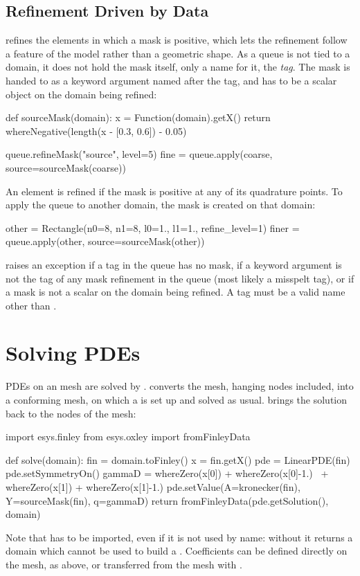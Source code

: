 \subsection{Refinement Driven by Data}\label{sec:oxley:mask}
 refines the elements in which a mask is positive, which
lets the refinement follow a feature of the model rather than a geometric
shape. As a queue is not tied to a domain, it does not hold the mask itself,
only a name for it, the \emph{tag}. The mask is handed to  as a
keyword argument named after the tag, and has to be a scalar \Data object on
the domain being refined:
\begin{python}
def sourceMask(domain):
    x = Function(domain).getX()
    return whereNegative(length(x - [0.3, 0.6]) - 0.05)

queue.refineMask("source", level=5)
fine = queue.apply(coarse, source=sourceMask(coarse))
\end{python}
An element is refined if the mask is positive at any of its quadrature points.
To apply the queue to another domain, the mask is created on that domain:
\begin{python}
other = Rectangle(n0=8, n1=8, l0=1., l1=1., refine_level=1)
finer = queue.apply(other, source=sourceMask(other))
\end{python}
 raises an exception if a tag in the queue has no mask, if a
keyword argument is not the tag of any mask refinement in the queue (most
likely a misspelt tag), or if a mask is not a scalar on the domain being
refined. A tag must be a valid \PYTHON name other than .

\section{Solving PDEs}\label{sec:oxley:pdes}
PDEs on an \oxley mesh are solved by \finley.  converts the
mesh, hanging nodes included, into a conforming \finley mesh, on which a
\LinearPDE is set up and solved as usual.  brings
the solution back to the nodes of the \oxley mesh:
\begin{python}
import esys.finley
from esys.oxley import fromFinleyData

def solve(domain):
    fin = domain.toFinley()
    x = fin.getX()
    pde = LinearPDE(fin)
    pde.setSymmetryOn()
    gammaD = whereZero(x[0]) + whereZero(x[0]-1.) \
           + whereZero(x[1]) + whereZero(x[1]-1.)
    pde.setValue(A=kronecker(fin), Y=sourceMask(fin), q=gammaD)
    return fromFinleyData(pde.getSolution(), domain)
\end{python}
Note that \finley has to be imported, even if it is not used by name: without
it \method{toFinley} returns a domain which cannot be used to build a
\LinearPDE. Coefficients can be defined directly on the \finley mesh, as
above, or transferred from the \oxley mesh with \function{toFinleyData}.

